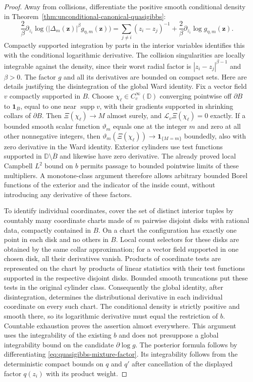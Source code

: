 \documentclass[11pt,a4paper]{article}
\numberwithin{equation}{section}
\theoremstyle{definition}
\theoremstyle{remark}
\newcommand{\D}{\mathbb D}
\begin{document}
\begin{proof}
Away from collisions, differentiate the positive smooth conditional
density in Theorem~\ref{thm:unconditional-canonical-quasigibbs}:
\[
 \frac2\beta\partial_{z_i}\log
       \bigl(|\Delta_m(\mathbf z)|^\beta g_{\eta,m}(\mathbf z)\bigr)
   =\sum_{j\ne i}(z_i-z_j)^{-1}
                  +\frac2\beta\partial_{z_i}\log g_{\eta,m}(\mathbf z).
\]
Compactly supported integration by parts in the interior variables
identifies this with the conditional logarithmic derivative. The
collision singularities are locally integrable against the density,
since their worst radial factor is $|z_i-z_j|^{\beta-1}$ and $\beta>0$.
The factor $g$ and all its derivatives are bounded on compact sets.
Here are details justifying the disintegration of the global Ward
identity. Fix a vector field $v$ compactly supported in $B$. Choose
$\chi_\ell\in C_c^\infty(\D)$ converging pointwise off $\partial B$
to $\mathbf1_B$, equal to one near $\operatorname{supp}v$, with their
gradients supported in shrinking collars of $\partial B$. Then
$\Xi(\chi_\ell)\to M$ almost surely, and
$\mathcal L_v\Xi(\chi_\ell)=0$ exactly. If a bounded smooth scalar
function $\vartheta_m$ equals one at the integer $m$ and zero at all
other nonnegative integers, then
$\vartheta_m(\Xi(\chi_\ell))\to\mathbf1_{\{M=m\}}$ boundedly, also
with zero derivative in the Ward identity. Exterior cylinders use
test functions supported in $\D\setminus\overline B$ and likewise
have zero derivative. The already proved local Campbell $L^2$ bound
on $b$ permits passage to bounded pointwise limits of these
multipliers. A monotone-class argument therefore allows arbitrary
bounded Borel functions of the exterior and the indicator of the
inside count, without introducing any derivative of these factors.

To identify individual coordinates, cover the set of distinct
interior tuples by countably many coordinate charts made of $m$
pairwise disjoint disks with rational data, compactly contained in
$B$. On a chart the configuration has exactly one point in each disk
and no others in $B$. Local count selectors for these disks are
obtained by the same collar approximation; for a vector field
supported in one chosen disk, all their derivatives vanish. Products
of coordinate tests are represented on the chart by products of
linear statistics with their test functions supported in the
respective disjoint disks. Bounded smooth truncations put these tests
in the original cylinder class. Consequently the global identity,
after disintegration, determines the distributional derivative in
each individual coordinate on every such chart. The conditional
density is strictly positive and smooth there, so its logarithmic
derivative must equal the restriction of $b$. Countable exhaustion
proves the assertion almost everywhere. This argument uses the
integrability of the existing $b$ and does not presuppose a global
integrability bound on the candidate $\partial\log g$.
The posterior formula follows by differentiating
\eqref{eq:quasigibbs-mixture-factor}. Its integrability follows from
the deterministic compact bounds on $q$ and $q'$ after cancellation of
the displayed factor $q(z_i)$ with its product weight.
\end{proof}
\end{document}
